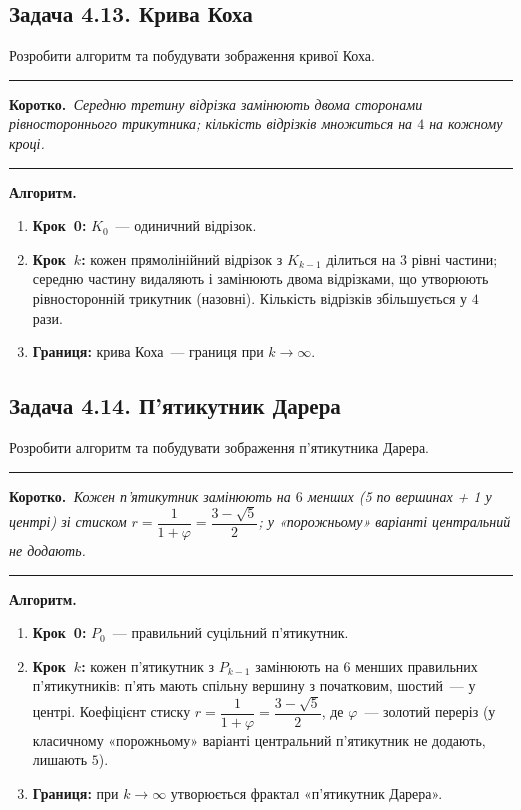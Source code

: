 \documentclass[12pt,a4paper]{article}
\newenvironment{korotko}
  {\par\medskip\noindent\begingroup\color{accent!75!black}\rule{\linewidth}{0.4pt}\par
   \noindent\textbf{Коротко.}\itshape\,}
  {\par\noindent\rule{\linewidth}{0.4pt}\endgroup\medskip}
\begin{document}
\subsection{Задача 4.13. Крива Коха}
Розробити алгоритм та побудувати зображення кривої Коха.

\begin{korotko}
Середню третину відрізка замінюють двома сторонами рівностороннього трикутника;
кількість відрізків множиться на $4$ на кожному кроці.
\end{korotko}

\textbf{Алгоритм.}
\begin{enumerate}[leftmargin=1.6em,itemsep=0.25em]
  \item \textbf{Крок~0:} $K_0$~--- одиничний відрізок.
  \item \textbf{Крок~$k$:} кожен прямолінійний відрізок з $K_{k-1}$ ділиться на $3$ рівні
        частини; середню частину видаляють і замінюють двома відрізками, що утворюють
        рівносторонній трикутник (назовні). Кількість відрізків збільшується у $4$ рази.
  \item \textbf{Границя:} крива Коха~--- границя при $k\to\infty$.
\end{enumerate}

\subsection{Задача 4.14. П'ятикутник Дарера}
Розробити алгоритм та побудувати зображення п'ятикутника Дарера.

\begin{korotko}
Кожен п'ятикутник замінюють на $6$ менших (5 по вершинах + 1 у центрі) зі стиском
$r=\dfrac{1}{1+\varphi}=\dfrac{3-\sqrt5}{2}$; у «порожньому» варіанті центральний не додають.
\end{korotko}

\textbf{Алгоритм.}
\begin{enumerate}[leftmargin=1.6em,itemsep=0.25em]
  \item \textbf{Крок~0:} $P_0$~--- правильний суцільний п'ятикутник.
  \item \textbf{Крок~$k$:} кожен п'ятикутник з $P_{k-1}$ замінюють на $6$ менших
        правильних п'ятикутників: п'ять мають спільну вершину з початковим, шостий~---
        у центрі. Коефіцієнт стиску
        $r=\dfrac{1}{1+\varphi}=\dfrac{3-\sqrt5}{2}$, де $\varphi$~--- золотий переріз
        (у класичному «порожньому» варіанті центральний п'ятикутник не додають, лишають $5$).
  \item \textbf{Границя:} при $k\to\infty$ утворюється фрактал «п'ятикутник Дарера».
\end{enumerate}
\end{document}
